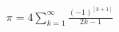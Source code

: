 \documentclass[preview]{standalone}
\begin{document}
\begin{align*}
\pi  = 4  \sum _{k=1}^{ \infty } \frac{(-1)^[k+1]}{ 2k - 1 }
\end{align*}
\end{document}
